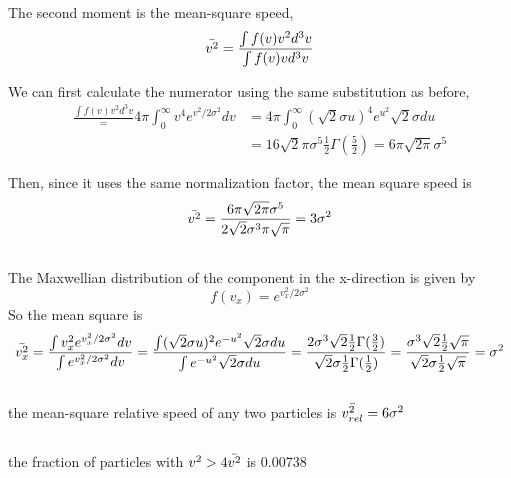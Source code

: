 \subsection{}
The second moment is the mean-square speed,
\begin{equation}
    \Bar{v^2} = \frac{\int f(v)v^2 d^3v}{\int f(v)v d^3v}
\end{equation}

We can first calculate the numerator using the same substitution as before,
\begin{align*}
    \frac{\int f(v)v^2 d^3v} = 4\pi\int_0^\infty v^4 e^{v^2/2\sigma^2}dv 
    &= 4\pi\int_0^\infty (\sqrt{2}\sigma u)^4 e^{u^2}\sqrt{2}\sigma du\\
    &= 16 \sqrt{2}\pi\sigma^5 \frac{1}{2}\Gamma(\frac{5}{2}) = 6\pi \sqrt{2\pi} \sigma^5
\end{align*}

Then, since it uses the same normalization factor, the mean square speed is
\begin{align*}
    \Bar{v^2} = \frac{6\pi \sqrt{2\pi} \sigma^5}{2\sqrt{2}\sigma^3 \pi \sqrt{\pi}} = 3\sigma^2
\end{align*}

\subsection{}
The Maxwellian distribution of the component in the x-direction is given by
\begin{equation}
    f(v_x)=e^{v_x^2/2\sigma^2}
\end{equation}
So the mean square is
\begin{equation}
    \Bar{v^2_x} 
    = \frac{\int v_x^2 e^{v_x^2/2\sigma^2} dv}{\int e^{v_x^2/2\sigma^2} dv} 
    = \frac{\int (\sqrt{2}\sigma u)^2 e^{-u^2}\sqrt{2}\sigma du}{\int e^{-u^2} \sqrt{2}\sigma du}
    = \frac{2\sigma^3\sqrt{2}\frac{1}{2}\Gamma(\frac{3}{2})}{\sqrt{2}\sigma\frac{1}{2}\Gamma(\frac{1}{2})}
    =\frac{\sigma^3\sqrt{2}\frac{1}{2}\sqrt{\pi}}{\sqrt{2}\sigma \frac{1}{2}\sqrt{\pi}}
    = \sigma^2
\end{equation}

\subsection{}
the mean-square relative speed of any two particles is $\Bar{v^2_{rel}}=6\sigma^2$



\subsection{}
the fraction of particles with $v^2>4\Bar{v^2}$ is 0.00738